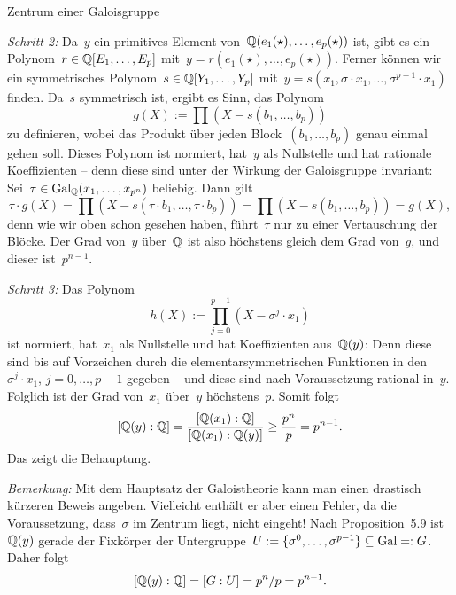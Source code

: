 \documentclass{algblatt}
\begin{document}
\begin{aufgabe}{Zentrum einer Galoisgruppe}
\begin{loesungE}
\emph{Schritt 2:} Da~$y$ ein primitives Element
von~$\mathbb{Q}(e_1(\star),\ldots,e_p(\star))$ ist, gibt es ein
Polynom~$r \in \mathbb{Q}[E_1,\ldots,E_p]$ mit~$y = r(e_1(\star),\ldots,e_p(\star))$. Ferner
können wir ein symmetrisches Polynom~$s \in \mathbb{Q}[Y_1,\ldots,Y_p]$ mit~$y = s(x_1, \sigma
\cdot x_1,\ldots, \sigma^{p-1} \cdot x_1)$ finden. Da~$s$ symmetrisch ist,
ergibt es Sinn, das Polynom
\[ g(X) := \prod (X - s(b_1,\ldots,b_p)) \]
zu definieren, wobei das Produkt über jeden Block~$(b_1,\ldots,b_p)$ genau
einmal gehen soll. Dieses Polynom ist normiert, hat~$y$ als Nullstelle und hat rationale
Koeffizienten -- denn diese sind unter der Wirkung der Galoisgruppe invariant:
Sei~$\tau \in \mathrm{Gal}_{\mathbb{Q}}(x_1,\ldots,x_{p^n})$ beliebig. Dann gilt
\[ \tau \cdot g(X) = \prod (X - s(\tau \cdot b_1,\ldots,\tau \cdot b_p)) =
  \prod (X - s(b_1,\ldots,b_p)) = g(X), \]
denn wie wir oben schon gesehen haben, führt~$\tau$ nur zu einer Vertauschung
der Blöcke. Der Grad von~$y$ über~$\mathbb{Q}$ ist also höchstens gleich dem Grad
von~$g$, und dieser ist~$p^{n-1}$.

\emph{Schritt 3:} Das Polynom
\[ h(X) := \prod_{j=0}^{p-1} (X - \sigma^j \cdot x_1) \]
ist normiert, hat~$x_1$ als Nullstelle und hat Koeffizienten aus~$\mathbb{Q}(y)$: Denn
diese sind bis auf Vorzeichen durch die elementarsymmetrischen Funktionen in
den~$\sigma^j \cdot x_1$, $j = 0,\ldots,p-1$ gegeben -- und diese sind nach
Voraussetzung rational in~$y$. Folglich ist der Grad von~$x_1$ über~$y$
höchstens~$p$. Somit folgt
\[ [\mathbb{Q}(y):\mathbb{Q}] = \frac{[\mathbb{Q}(x_1):\mathbb{Q}]}{[\mathbb{Q}(x_1):\mathbb{Q}(y)]} \geq
\frac{p^n}{p} = p^{n-1}. \]
Das zeigt die Behauptung.

\emph{Bemerkung:} Mit dem Hauptsatz der Galoistheorie kann man einen
drastisch kürzeren Beweis angeben. Vielleicht enthält er aber einen Fehler, da
die Voraussetzung, dass~$\sigma$ im Zentrum liegt, nicht eingeht! Nach
Proposition~5.9 ist~$\mathbb{Q}(y)$ gerade der Fixkörper der Untergruppe~$U := \{
\sigma^0,\ldots,\sigma^{p-1} \} \subseteq \mathrm{Gal} =: G$. Daher folgt
\[ [\mathbb{Q}(y):\mathbb{Q}] = [G:U] = p^n / p = p^{n-1}. \]
\end{loesungE}
\end{aufgabe}
\end{document}

